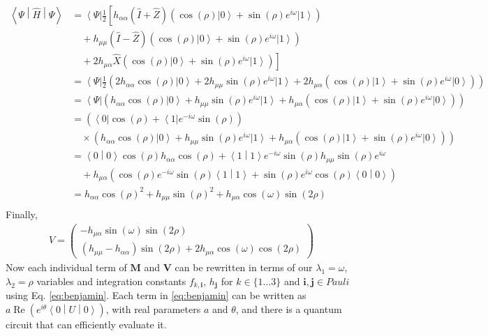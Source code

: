 \documentclass{aux/ttuthes2007}
\newcommand{\bra}[1]{\ensuremath{\left\langle#1\right\vert}}
\newcommand{\ket}[1]{\ensuremath{\left|#1\right\rangle}}
\newcommand{\braket}[2]{\left< #1 \middle\vert #2 \right>}
\newcommand{\sandwich}[3]{\left< #1 \middle\vert #2 \middle\vert #3 \right>}
\newcommand{\s}[1]{\sin\left( #1 \right)}
\newcommand{\co}[1]{\cos\left( #1 \right)}
\newcommand{\paren}[1]{\left( #1 \right)}
\begin{document}
\begin{equation*}
	\begin{split}
		\sandwich \Psi {\hat H} \Psi
		&= \bra \Psi \frac 1 2 \left[
			h_{\alpha\alpha} (\hat I + \hat Z) \paren{\co \rho \ket 0 + \s \rho e^{i\omega} \ket 1} \right .\\
		& \quad + h_{\mu\mu} (\hat I - \hat Z) \paren{\co \rho \ket 0 + \s \rho e^{i\omega} \ket 1} \\
		&\left. \quad + 2 h_{\mu\alpha} \hat X \paren{\co \rho \ket 0 + \s \rho e^{i\omega} \ket 1}
		\right] \\
		&= \bra \Psi \frac 1 2 \left(
			2h_{\alpha\alpha} \co \rho \ket 0 + 2h_{\mu\mu} \s \rho e^{i\omega} \ket 1
			+ 2h_{\mu\alpha} \paren{\co \rho \ket 1 + \s \rho e^{i\omega} \ket 0}
		\right) \\
		&= \bra \Psi \left(
			h_{\alpha\alpha} \co \rho \ket 0 + h_{\mu\mu} \s \rho e^{i\omega} \ket 1
			+ h_{\mu\alpha} \paren{\co \rho \ket 1 + \s \rho e^{i\omega} \ket 0}
		\right) \\
		&= \paren{\bra 0 \co \rho  + \bra 1 e^{-i \omega} \s \rho } \\
		& \quad \times \left (
			h_{\alpha\alpha} \co \rho \ket 0 + h_{\mu\mu} \s \rho e^{i\omega} \ket 1
			+ h_{\mu\alpha} \paren{\co \rho \ket 1 + \s \rho e^{i\omega} \ket 0}
		\right) \\
		&= \braket 0 0 \co \rho h_{\alpha\alpha} \co \rho 
		+ \braket 1 1 e^{-i \omega} \s \rho h_{\mu\mu} \s \rho e^{i\omega} \\
		&\quad + h_{\mu\alpha} \paren{\co \rho e^{-i \omega} \s \rho \braket 1 1 + \s \rho e^{i\omega} \co \rho \braket 0 0} \\
		&=  h_{\alpha\alpha} \co \rho ^2
		+ h_{\mu\mu} \s \rho ^2
		+ h_{\mu\alpha} \co \omega \s {2\rho}\\
	\end{split}
\end{equation*}
%
Finally,
%
\begin{equation*}
	\begin{split}
		V = \begin{pmatrix}
			- h_{\mu\alpha} \s \omega \s {2\rho} \\
			(h_{\mu\mu} - h_{\alpha\alpha}) \s {2\rho}
			+ 2h_{\mu\alpha} \co \omega \co {2\rho}
		\end{pmatrix}
	\end{split}
\end{equation*}
%
Now each individual term of $\bm M$ and $\bm V$ can be rewritten in terms of our $\lambda_1 = \omega$, $\lambda_2 = \rho$ variables and integration constants $f_{k, \bm i}$, $h_{\bm j}$ for $k \in \{1 \ldots 3\}$ and $\bm i, \bm j \in Pauli$ using Eq. \ref{eq:benjamin}.
%
Each term in \ref{eq:benjamin} can be written as $a\operatorname{Re}\paren{e^{i\theta}\sandwich 0 U 0}$, with real parameters $a$ and $\theta$, and there is a quantum circuit that can efficiently evaluate it.
%
%
\end{document}
